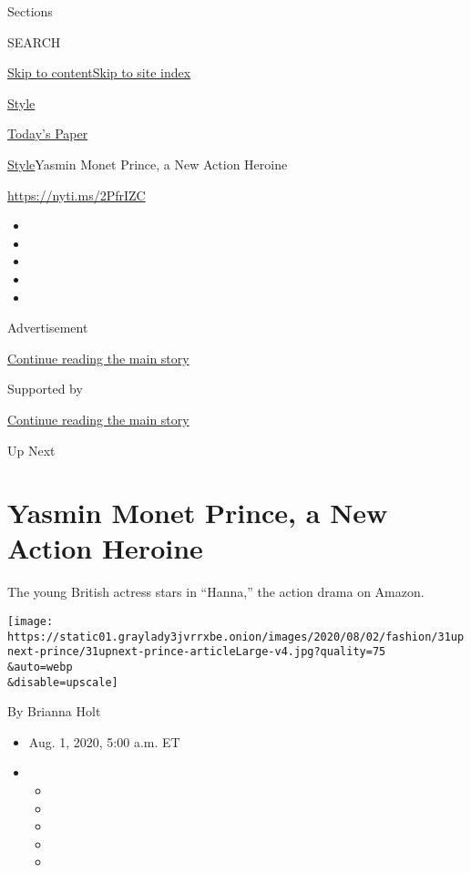Sections

SEARCH

\protect\hyperlink{site-content}{Skip to
content}\protect\hyperlink{site-index}{Skip to site index}

\href{https://www.nytimes3xbfgragh.onion/section/style}{Style}

\href{https://myaccount.nytimes3xbfgragh.onion/auth/login?response_type=cookie\&client_id=vi}{}

\href{https://www.nytimes3xbfgragh.onion/section/todayspaper}{Today's
Paper}

\href{/section/style}{Style}\textbar{}Yasmin Monet Prince, a New Action
Heroine

\url{https://nyti.ms/2PfrIZC}

\begin{itemize}
\item
\item
\item
\item
\item
\end{itemize}

Advertisement

\protect\hyperlink{after-top}{Continue reading the main story}

Supported by

\protect\hyperlink{after-sponsor}{Continue reading the main story}

Up Next

\hypertarget{yasmin-monet-prince-a-new-action-heroine}{%
\section{Yasmin Monet Prince, a New Action
Heroine}\label{yasmin-monet-prince-a-new-action-heroine}}

The young British actress stars in ``Hanna,'' the action drama on
Amazon.

\texttt{[image: https://static01.graylady3jvrrxbe.onion/images/2020/08/02/fashion/31upnext-prince/31upnext-prince-articleLarge-v4.jpg?quality=75\\\&auto=webp\\\&disable=upscale]}

By Brianna Holt

\begin{itemize}
\item
  Aug. 1, 2020, 5:00 a.m. ET
\item
  \begin{itemize}
  \item
  \item
  \item
  \item
  \item
  \end{itemize}
\end{itemize}


